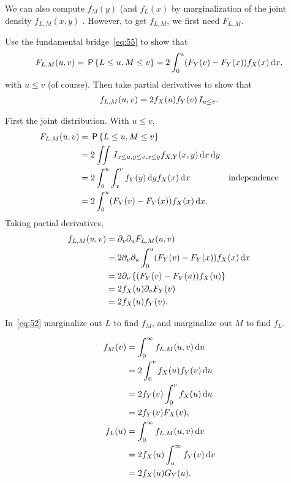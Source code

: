 \documentclass[a4paper,11pt]{article}
\begin{document}
We can also compute $f_{M}(y)$ (and $f_{L}(x)$ by marginalization of the joint density $f_{L,M}(x,y)$ .
However, to get $f_{L,M}$, we first need $F_{L,M}$.
\begin{exercise}
Use the fundamental bridge~\cref{eq:55} to show that
\begin{equation*}
  F_{L,M}(u,v) = \,\mathsf{P}\left\{L\leq u, M\leq v\right\} = 2\int_0^u (F_Y(v)- F_Y(x)) f_X(x) \,\textrm{d}x,
\end{equation*}
with $u\leq v$ (of course). Then take partial derivatives to show that
\begin{align}
  \label{eq:52}
f_{L,M}(u,v) = 2f_X(u) f_Y(v)\,I_{u\leq v}.
\end{align}

\begin{solution}
First the joint distribution. With $u\leq v$,
  \begin{align}
    \label{eq:51}
F_{L,M}(u,v) &= \,\mathsf{P}\left\{L\leq u, M \leq v\right\} \\
&= 2\iint \,I_{x \leq u, y\leq v, x\leq y} f_{X,Y}(x,y)\,\textrm{d}x \,\textrm{d}y \\
&= 2\int_0^u \int_x^v f_Y(y) \,\textrm{d}y f_X(x) \,\textrm{d}x & \text{independence} \\
&= 2\int_0^u (F_Y(v)- F_Y(x)) f_X(x) \,\textrm{d}x.
  \end{align}
Taking partial derivatives,
\begin{align}
f_{L,M}(u,v)
&=\partial_v\partial_{u}F_{L,M}(u,v) \\
&=2 \partial_v\partial_{u} \int_0^u (F_Y(v)- F_Y(x)) f_X(x) \,\textrm{d}x  \\
&=2 \partial_v \left\{(F_Y(v)- F_Y(u)) f_X(u) \right \}  \\
&=2 f_X(u)\partial_v F_Y(v)  \\
&=2 f_X(u)f_Y(v).
\end{align}
\end{solution}
\end{exercise}

\begin{exercise}
In~\cref{eq:52} marginalize out $L$ to find $f_M$, and marginalize out $M$ to find $f_L$.
\begin{solution}
\begin{align}
  \label{eq:54}
  f_M(v) &=  \int_0^{\infty} f_{L,M}(u,v) \,\textrm{d}u \\
&= 2 \int_0^{v} f_{X}(u) f_Y(v) \,\textrm{d}u \\
&= 2 f_Y(v) \int_0^{v} f_{X}(u) \,\textrm{d}u  \\
&= 2f_Y(v) F_X(v), \\
f_L(u) &=  \int_0^{\infty} f_{L,M}(u,v) \,\textrm{d}v \\
&= 2 f_{X}(u) \int_u^{\infty} f_Y(v) \,\textrm{d}v \\
&= 2 f_{X}(u) G_{Y}(u).
\end{align}
\end{solution}
\end{exercise}
\end{document}
